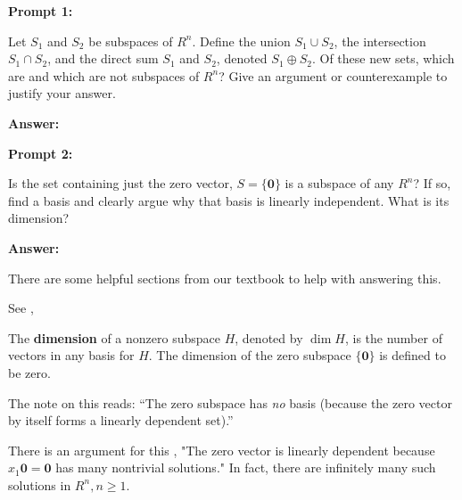 \documentclass[10pt,letterpaper,final]{report}
\begin{document}
\begin{center}
  \vline
\end{center}

\medskip
\noindent\textbf{Prompt 1:}
\medskip

Let $S_1$ and $S_2$ be subspaces of $R^n$. Define the union $S_1 \cup S_2$, the intersection $S_1 \cap S_2$, and the direct sum $S_1$ and $S_2$, denoted $S_1 \oplus S_2$. Of these new sets, which are and which are not subspaces of $R^n$? Give an argument or counterexample to justify your answer.

\medskip
\noindent\textbf{Answer:}
\medskip



\medskip
\noindent\textbf{Prompt 2:}
\medskip

Is the set containing just the zero vector, $S = \{\mathbf{0}\}$ is a subspace of any $R^n$? If so, find a basis and clearly argue why that basis is linearly independent. What is its dimension?

\medskip
\noindent\textbf{Answer:}
\medskip

There are some helpful sections from our textbook to help with answering this.

See \textcite[Ch. 2.9, p. 164]{LayEtAl2020LinearAlgebraAndItsApplications},

\begin{tcolorbox}[colback=blue!10!white, colframe=blue!10!black, title=Definition - Dimension of a Subspace]
  The \textbf{dimension} of a nonzero subspace $H$, denoted by $\dim H$, is the number of vectors in any basis for $H$. The dimension of the zero subspace $\{\mathbf{0}\}$ is defined to be zero.
\end{tcolorbox}

The note on this reads: ``The zero subspace has \emph{no} basis (because the zero vector by itself forms a linearly dependent set).''

There is an argument for this \textcite[Ch. 1.7, p. 61]{LayEtAl2020LinearAlgebraAndItsApplications}, "The zero vector is linearly dependent because $x_1\mathbf{0} = \mathbf{0}$ has many nontrivial solutions." In fact, there are infinitely many such solutions in $R^n, n \ge 1$.
\end{document}
